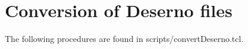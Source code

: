%  
%   
%  
%  
%
\chapter{Conversion of Deserno files}
The following procedures are found in scripts/convertDeserno.tcl.

